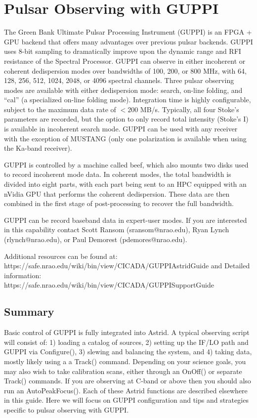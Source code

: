 \chapter{Pulsar Observing with GUPPI}
\label{chap:GUPPI}

The Green Bank Ultimate Pulsar Processing Instrument (GUPPI) is an
FPGA + GPU backend that offers many advantages over previous pulsar
backends.  GUPPI uses 8-bit sampling to dramatically improve upon the
dynamic range and RFI resistance of the Spectral Processor.  GUPPI can
observe in either incoherent or coherent dedispersion modes over
bandwidths of 100, 200, or 800 MHz, with 64, 128, 256, 512, 1024,
2048, or 4096 spectral channels.  Three pulsar observing modes are
available with either dedispersion mode: search, on-line folding, and
``cal'' (a specialized on-line folding mode).  Integration time is
highly configurable, subject to the maximum data rate of $< 200$ MB/s.
Typically, all four Stoke's parameters are recorded, but the option to
only record total intensity (Stoke's I) is available in incoherent
search mode.  GUPPI can be used with any receiver with the exception
of MUSTANG (only one polarization is available when using the Ka-band
receiver).

GUPPI is controlled by a machine called beef, which also mounts two
disks used to record incoherent mode data.  In coherent modes, the
total bandwidth is divided into eight parts, with each part being sent
to an HPC equipped with an nVidia GPU that performs the coherent
dedispersion.  These data are then combined in the first stage of
post-processing to recover the full bandwidth.

\hfil\break GUPPI can be record baseband data in expert-user modes.
If you are interested in this capability contact Scott Ransom
(sransom@nrao.edu), Ryan Lynch (rlynch@nrao.edu), or Paul Demorest
(pdemores@nrao.edu).
 
\hfil\break
Additional resources can be found at:
\hfil\break
https://safe.nrao.edu/wiki/bin/view/CICADA/GUPPIAstridGuide
and \hfil\break
Detailed information:
https://safe.nrao.edu/wiki/bin/view/CICADA/GUPPISupportGuide
\hfil\break

\section{Summary}
\label{sec:GUPPI} 
Basic control of GUPPI is fully integrated into Astrid.  A typical
observing script will consist of: 1) loading a catalog of sources, 2)
setting up the IF/LO path and GUPPI via Configure(), 3) slewing and
balancing the system, and 4) taking data, mostly likely using a a
Track() command.  Depending on your science goals, you may also wish
to take calibration scans, either through an OnOff() or separate
Track() commands.  If you are observing at C-band or above then you
should also run an AutoPeakFocus().  Each of these Astrid functions
are described elsewhere in this guide.  Here we will focus on GUPPI
configuration and tips and strategies specific to pulsar observing
with GUPPI.

